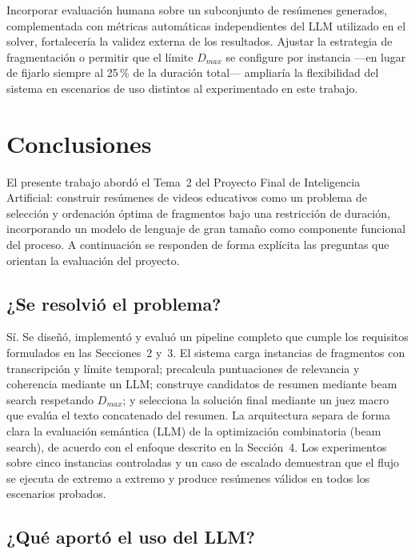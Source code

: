 \documentclass[12pt,a4paper]{article}
\begin{document}
Incorporar evaluación humana sobre un subconjunto de resúmenes generados, complementada con métricas automáticas independientes del LLM utilizado en el solver, fortalecería la validez externa de los resultados. Ajustar la estrategia de fragmentación o permitir que el límite \(D_{max}\) se configure por instancia ---en lugar de fijarlo siempre al 25\,\% de la duración total--- ampliaría la flexibilidad del sistema en escenarios de uso distintos al experimentado en este trabajo.



\section{Conclusiones}

El presente trabajo abordó el Tema~2 del Proyecto Final de Inteligencia Artificial: construir resúmenes de videos educativos como un problema de selección y ordenación óptima de fragmentos bajo una restricción de duración, incorporando un modelo de lenguaje de gran tamaño como componente funcional del proceso. A continuación se responden de forma explícita las preguntas que orientan la evaluación del proyecto.

\subsection{¿Se resolvió el problema?}

Sí. Se diseñó, implementó y evaluó un pipeline completo que cumple los requisitos formulados en las Secciones~2 y~3. El sistema carga instancias de fragmentos con transcripción y límite temporal; precalcula puntuaciones de relevancia y coherencia mediante un LLM; construye candidatos de resumen mediante beam search respetando \(D_{max}\); y selecciona la solución final mediante un juez macro que evalúa el texto concatenado del resumen. La arquitectura separa de forma clara la evaluación semántica (LLM) de la optimización combinatoria (beam search), de acuerdo con el enfoque descrito en la Sección~4. Los experimentos sobre cinco instancias controladas y un caso de escalado demuestran que el flujo se ejecuta de extremo a extremo y produce resúmenes válidos en todos los escenarios probados.

\subsection{¿Qué aportó el uso del LLM?}
\end{document}

